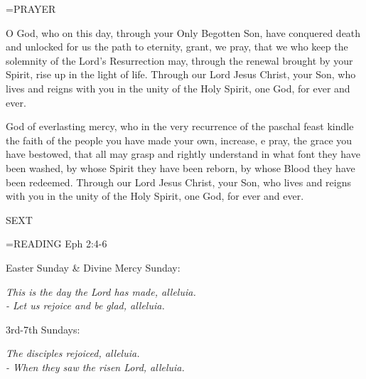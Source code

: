 \hangindent=\parindent \small PRAYER
\begin{description}[labelindent=\parindent, leftmargin=*]
\item [Easter Sunday:] 	O God, who on this day, through your Only Begotten Son, have conquered death and unlocked for us the path to eternity, grant, we pray, that we who keep the solemnity of the Lord's Resurrection may, through the renewal brought by your Spirit, rise up in the light of life. Through our Lord Jesus Christ, your Son, who lives and reigns with you in the unity of the Holy Spirit, one God, for ever and ever.
\item [Divine Mercy Sunday:] 	God of everlasting mercy, who in the very recurrence of the paschal feast kindle the faith of the people you have made your own, increase, e pray, the grace you have bestowed, that all may grasp and rightly understand in what font they have been washed, by whose Spirit they have been reborn, by whose Blood they have been redeemed. Through our Lord Jesus Christ, your Son, who lives and reigns with you in the unity of the Holy Spirit, one God, for ever and ever.
\item [3rd Sunday:] 		
\item [4th Sunday:] 		
\item [5th Sunday:] 		
\item [6th Sunday:] 		
\item [7th Sunday:] 	
\end{description}

\begin{flushleft}\normalsize SEXT\\\end{flushleft}

\hangindent=\parindent \small{\uppercase{READING}}    Eph 2:4-6 \textbf{   \\}

\begin{center}
\end{center}Easter Sunday \& Divine Mercy Sunday:\begin{center}\textit{	This is the day the Lord has made, alleluia.\\
- Let us rejoice and be glad, alleluia.}
\end{center}3rd-7th Sundays:\begin{center}\textit{	The disciples rejoiced, alleluia.\\
- When they saw the risen Lord, alleluia.}
\end{center}

